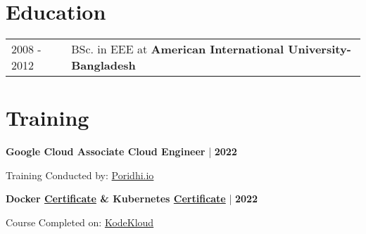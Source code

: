 \documentclass {article}
\begin{document}
\section{Education}
\begin{tabularx}{\linewidth}{@{}l X@{}}	
2008 - 2012 & BSc. in EEE at \textbf{American International University-Bangladesh} \hfill \normalsize \\
\end{tabularx}

\section{Training}

    \begin{minipage}[t]{0.7\textwidth}
        \large \textbf{Google Cloud Associate Cloud Engineer} | \textbf{2022}
    \end{minipage}

    \begin{minipage}[t]{0.5\textwidth}
         Training Conducted by: \href{https://poridhi.io/}{Poridhi.io} 
    \end{minipage}

    \begin{minipage}[t]{0.7\textwidth}
         \large \textbf{Docker \href{https://kodekloud.com/certificate-verification/73614B2C60-735B546104-735B181BB8/}{Certificate} \& Kubernetes \href{https://kodekloud.com/certificate-verification/73614B2C60-735B5486E3-735B181BB8/}{Certificate}} | \textbf{2022}
    \end{minipage}

    \begin{minipage}[t]{0.5\textwidth}
         Course Completed on: \href{https://kodekloud.com/}{KodeKloud}
    \end{minipage}
    
\end{document}
